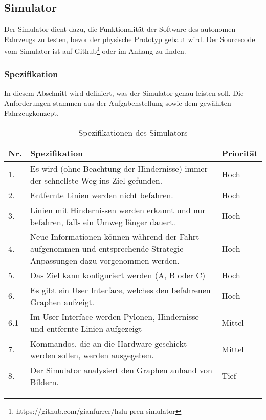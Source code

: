 \documentclass[../main.tex]{subfiles}
\begin{document}
\newpage
\subsection{Simulator}\label{simulator}

Der Simulator dient dazu, die Funktionalität der Software des autonomen Fahrzeugs zu testen, bevor der physische Prototyp gebaut wird.
Der Sourcecode vom Simulator ist auf Github\footnote{https://github.com/gianfurrer/hslu-pren-simulator} oder im Anhang zu finden.

\subsubsection{Spezifikation}

In diesem Abschnitt wird definiert, was der Simulator genau leisten soll. Die Anforderungen stammen aus der Aufgabenstellung sowie dem gewählten Fahrzeugkonzept.

\begin{table}[htbp!]
    \centering
    \begin{tabularx}{\textwidth}{| l | X | l |}
        \hline
        \textbf{Nr.} & \textbf{Spezifikation} & \textbf{Priorität} \\ \hline
        1. & Es wird (ohne Beachtung der Hindernisse) immer der schnellste Weg ins Ziel gefunden. & Hoch \\ \hline
        2. & Entfernte Linien werden nicht befahren. & Hoch \\ \hline
        3. & Linien mit Hindernissen werden erkannt und nur befahren, falls ein Umweg länger dauert. & Hoch \\ \hline
        4. & Neue Informationen können während der Fahrt aufgenommen und entsprechende Strategie-Anpassungen dazu vorgenommen werden. & Hoch \\ \hline
        5. & Das Ziel kann konfiguriert werden (A, B oder C) & Hoch \\ \hline
        6. & Es gibt ein User Interface, welches den befahrenen Graphen aufzeigt. & Hoch \\ \hline
        6.1 & Im User Interface werden Pylonen, Hindernisse und entfernte Linien aufgezeigt & Mittel \\ \hline
        7. & Kommandos, die an die Hardware geschickt werden sollen, werden ausgegeben. & Mittel \\ \hline
        8. & Der Simulator analysiert den Graphen anhand von Bildern. & Tief \\ \hline
    \end{tabularx}
    \caption{Spezifikationen des Simulators}
\end{table}
\end{document}
